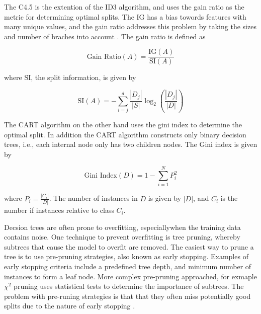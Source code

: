 \documentclass[conference]{IEEEtran}
\begin{document}
        The C4.5 is the extention of the ID3 algorithm, and uses the gain ratio as the metric for determining optimal
        splits. The IG has a bias towords features with many unique values, and the gain ratio addresses
        this problem by taking the sizes and number of braches into account \cite{Kelleher2015}. The gain ratio is defined as

        \begin{equation}
            \text{Gain Ratio}(A) = \frac{\text{IG}(A)}{\text{SI}(A)}
        \end{equation}
            
        where SI, the split information, is given by

        \begin{equation}
            \text{SI}(A) = - \sum_{i=j}^{d} \frac{|D_j|}{|S|} \log_2 \left( \frac{|D_j|}{|D|} \right)
        \end{equation}
            
        The CART algorithm \cite{DT_breiman1984classification} on the other hand uses the gini index to determine
        the optimal split. In addition the CART algorithm constructs only binary decision trees, i.e., each internal
        node only has two children nodes. The Gini index is given by 

        \begin{equation}
            \text{Gini Index}(D) = 1 - \sum_{i=1}^{N} P_i^2
        \end{equation}
            
        where $P_i = \frac{|C_i|}{|D|}$. The number of instances in $D$ is given by $|D|$, and $C_i$
        is the number if instances relative to class $C_i$.

        Decsion trees are often prone to overfitting, especiallywhen the training data contains noise.
        One technique to prevent overfitting is tree pruning, whereby subtrees that cause the model to overfit
        are removed. The easiest way to prune a tree is to use pre-pruning strategies, also known as early stopping.
        Examples of early stopping criteria include a predefined tree depth, and minimum number of instances to form
        a leaf node. More complex pre-pruning approached, for exmaple $\chi^2$ pruning uses statistical tests
        to determine the importance of subtrees. The problem with pre-runing strategies is that
        that they often miss potentially good splits due to the nature of early stopping \cite{Kelleher2015}.
\end{document}
